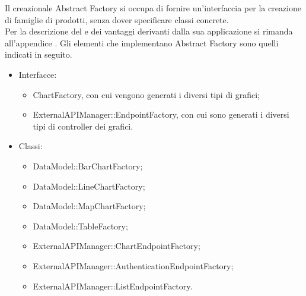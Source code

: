 			Il  creazionale Abstract Factory si occupa di fornire un'interfaccia per la creazione di famiglie di prodotti, senza dover specificare classi concrete.\\
			Per la descrizione del  e dei vantaggi derivanti dalla sua applicazione si rimanda all'appendice .
				Gli elementi che implementano Abstract Factory sono quelli indicati in seguito.
				\begin{itemize}
					\item Interfacce:
					\begin{itemize}
						\item ChartFactory, con cui vengono generati i diversi tipi di grafici;
						\item ExternalAPIManager::EndpointFactory, con cui sono generati i diversi tipi di controller dei grafici.
					\end{itemize}
					\item Classi:
					\begin{itemize}
						\item DataModel::BarChartFactory;
						\item DataModel::LineChartFactory;
						\item DataModel::MapChartFactory;
						\item DataModel::TableFactory;
						\item ExternalAPIManager::ChartEndpointFactory;
						\item ExternalAPIManager::AuthenticationEndpointFactory;
						\item ExternalAPIManager::ListEndpointFactory.
					\end{itemize}
				\end{itemize}
		
